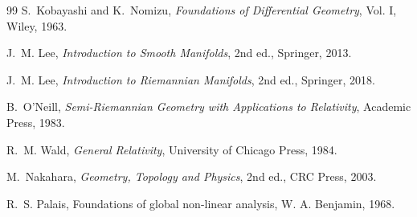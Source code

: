 \documentclass[11pt,a4paper]{article}
\theoremstyle{definition}
\theoremstyle{plain}
\theoremstyle{remark}
\begin{document}
\begin{thebibliography}{99}
S.~Kobayashi and K.~Nomizu,
\emph{Foundations of Differential Geometry}, Vol. I,
Wiley, 1963.

J.~M. Lee,
\emph{Introduction to Smooth Manifolds}, 2nd ed.,
Springer, 2013.

J.~M. Lee,
\emph{Introduction to Riemannian Manifolds}, 2nd ed.,
Springer, 2018.

B.~O'Neill,
\emph{Semi-Riemannian Geometry with Applications to Relativity},
Academic Press, 1983.

R.~M. Wald,
\emph{General Relativity},
University of Chicago Press, 1984.

M.~Nakahara,
\emph{Geometry, Topology and Physics}, 2nd ed.,
CRC Press, 2003.

R.~S. Palais,
Foundations of global non-linear analysis,
W. A. Benjamin, 1968.
\end{thebibliography}
\end{document}
